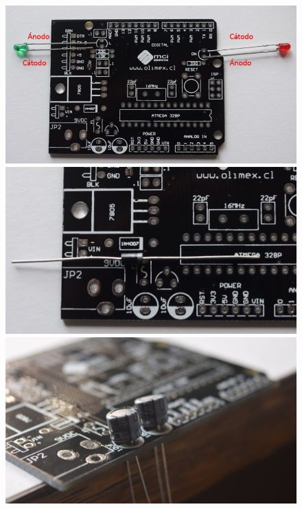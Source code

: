 \documentclass[12pt,letterpaper]{article}
\numberwithin{figure}{section}
\numberwithin{equation}{section}
\numberwithin{table}{section}
\begin{document}
\begin{figure}[H]
    \centering
    \begin{minipage}{.5\textwidth}
    \centering
    \includegraphics[width=\linewidth]{Figuras/figure_11_a.jpg}
    \end{minipage}%
    \begin{minipage}{0.5\textwidth}
    \centering
    \includegraphics[width=\linewidth]{Figuras/figure_11_b.jpg}   
    \end{minipage}
    \centering
    \begin{minipage}{0.5\textwidth}
    \centering
    \includegraphics[width=\linewidth]{Figuras/figure_11_c.jpg}

\end{minipage}
\end{figure}
\end{document}
